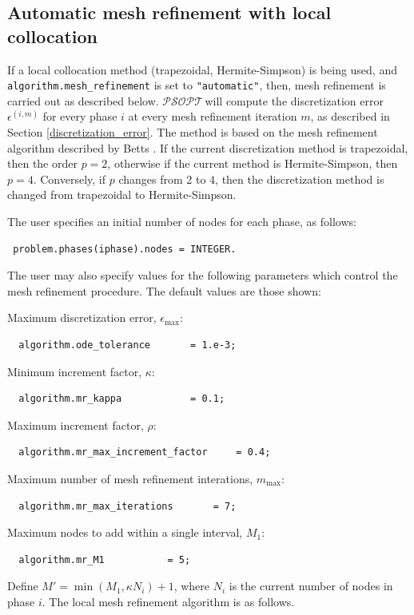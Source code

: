 \documentclass[a4paper,11pt]{report}    %
\newcommand{\psopt}{$\mathcal{PSOPT}$\,}  %
\begin{document}
\subsection{Automatic mesh refinement with local collocation}
If a local collocation method (trapezoidal, Hermite-Simpson) is being used, and \verb|algorithm.mesh_refinement| is set to \verb|"automatic"|,
then, mesh refinement is carried out as described below. \psopt will compute the discretization error
$\epsilon^{(i,m)}$ for every phase $i$  at every mesh refinement iteration $m$, as described in Section \ref{discretization_error}.
The method is based on the mesh refinement algorithm described by Betts \cite{Betts:01}. If the current discretization method is trapezoidal, then the order $p=2$, otherwise if the current method is 
Hermite-Simpson, then $p=4$. Conversely, if $p$ changes from 2 to 4, then the discretization method is changed from
trapezoidal to Hermite-Simpson.


The user specifies an initial number of nodes for each phase, as follows:
\begin{verbatim}
 problem.phases(iphase).nodes = INTEGER.
\end{verbatim}

The user may also specify values for the following parameters which control the mesh refinement
procedure. The default values are those shown:

\vspace{4mm}

\noindent Maximum discretization error, $\epsilon_{\max}$: 
\begin{verbatim}
  algorithm.ode_tolerance		= 1.e-3;
\end{verbatim}
Minimum increment factor, $\kappa$:
\begin{verbatim}
  algorithm.mr_kappa			= 0.1;
\end{verbatim}
Maximum increment factor, $\rho$:
\begin{verbatim}
  algorithm.mr_max_increment_factor     = 0.4;
\end{verbatim}
Maximum number of mesh refinement interations, $m_{\max}$:
\begin{verbatim}
  algorithm.mr_max_iterations		= 7;
\end{verbatim}
Maximum  nodes to add within a single interval, $M_1$:
\begin{verbatim}
  algorithm.mr_M1			= 5;
\end{verbatim}

Define $M'=\min( M_1, \kappa N_i)+1$, where $N_i$ is the current number of nodes in phase $i$. The local mesh refinement algorithm is as follows.
\end{document}
